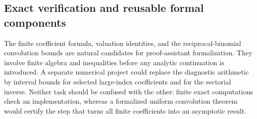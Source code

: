 \subsection{Exact verification and reusable formal components}

The finite coefficient formula, valuation identities, and the
reciprocal-binomial convolution bounds are natural candidates for
proof-assistant formalization. They involve finite algebra and
inequalities before any analytic continuation is introduced.
A separate numerical project could replace the diagnostic arithmetic
by interval bounds for selected large-index coefficients and for the
sectorial inverse. Neither task should be confused with the other:
finite exact computations check an implementation, whereas a
formalized uniform convolution theorem would certify the step that
turns all finite coefficients into an asymptotic result.
